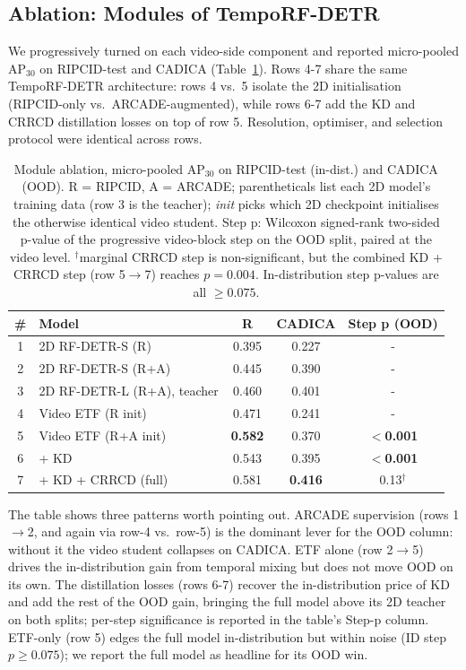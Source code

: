 \documentclass[conference]{IEEEtran}
\begin{document}
\subsection{Ablation: Modules of TempoRF-DETR}
\label{sec:exp_ablation}

We progressively turned on each video-side component and reported micro-pooled AP$_{30}$ on RIPCID-test and CADICA (Table~\ref{tab:ablation_modules}). Rows 4-7 share the same TempoRF-DETR architecture: rows 4 vs.\ 5 isolate the 2D initialisation (RIPCID-only vs.\ ARCADE-augmented), while rows 6-7 add the KD and CRRCD distillation losses on top of row 5. Resolution, optimiser, and selection protocol were identical across rows.

\begin{table}[!t]
\centering
\caption{Module ablation, micro-pooled AP$_{30}$ on RIPCID-test (in-dist.) and CADICA (OOD). R = RIPCID, A = ARCADE; parentheticals list each 2D model's training data (row 3 is the teacher); \emph{init} picks which 2D checkpoint initialises the otherwise identical video student. Step p: Wilcoxon signed-rank two-sided p-value of the progressive video-block step on the OOD split, paired at the video level. $^{\dagger}$marginal CRRCD step is non-significant, but the combined KD + CRRCD step (row 5$\rightarrow$7) reaches $p=0.004$. In-distribution step p-values are all $\geq 0.075$.}
\label{tab:ablation_modules}
\footnotesize
\setlength{\tabcolsep}{4pt}
\begin{tabular}{clccc}
\hline
\textbf{\#} & \textbf{Model} & \textbf{R} & \textbf{CADICA} & \textbf{Step p (OOD)} \\
\hline
1 & 2D RF-DETR-S (R)              & 0.395 & 0.227 &  -  \\
2 & 2D RF-DETR-S (R+A)            & 0.445 & 0.390 &  -  \\
3 & 2D RF-DETR-L (R+A), teacher   & 0.460 & 0.401 &  -  \\
\hline
4 & Video ETF (R init)            & 0.471 & 0.241 &  -  \\
\hline
5 & Video ETF (R+A init)          & \textbf{0.582} & 0.370 & \textbf{$<$0.001} \\
6 & \quad + KD                    & 0.543 & 0.395 & \textbf{$<$0.001} \\
7 & \quad + KD + CRRCD (full)     & 0.581 & \textbf{0.416} & 0.13$^{\dagger}$ \\
\hline
\end{tabular}
\end{table}

The table shows three patterns worth pointing out. ARCADE supervision (rows 1$\rightarrow$2, and again via row-4 vs.\ row-5) is the dominant lever for the OOD column: without it the video student collapses on CADICA. ETF alone (row 2$\rightarrow$5) drives the in-distribution gain from temporal mixing but does not move OOD on its own. The distillation losses (rows 6-7) recover the in-distribution price of KD and add the rest of the OOD gain, bringing the full model above its 2D teacher on both splits; per-step significance is reported in the table's Step-p column. ETF-only (row 5) edges the full model in-distribution but within noise (ID step $p\geq 0.075$); we report the full model as headline for its OOD win.
\end{document}
